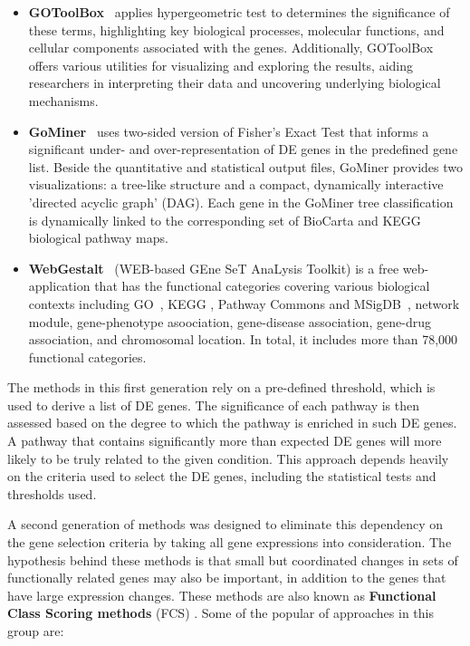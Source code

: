 \documentclass[Minh_PhD_thesis.tex]{subfiles}
\begin{document}
\begin{itemize}
\item \textbf{GOToolBox}~\cite{Martin:2004} applies hypergeometric test to determines the significance of these terms, highlighting key biological processes, molecular functions, and cellular components associated with the genes. Additionally, GOToolBox offers various utilities for visualizing and exploring the results, aiding researchers in interpreting their data and uncovering underlying biological mechanisms.

\item \textbf{GoMiner}~\cite{GoMiner, Zeeberg:2005} uses two-sided version of Fisher's Exact Test that informs a significant under- and over-representation of DE genes in the predefined gene list. Beside the quantitative and statistical output files, GoMiner provides two visualizations: a tree-like structure and a compact, dynamically interactive 'directed acyclic graph' (DAG). Each gene in the GoMiner tree classification is dynamically linked to the corresponding set of BioCarta and KEGG biological pathway maps.

\item \textbf{WebGestalt}~\cite{zhang2005webgestalt, wang2013web} (WEB-based GEne SeT AnaLysis Toolkit) is a free web-application that has the functional categories covering various biological contexts including GO~\cite{Ashburner:2000}, KEGG \cite{kanehisa:2008}, Pathway Commons \cite{cerami2011pathway} and MSigDB~\cite{liberzon2011molecular}, network module, gene-phenotype asoociation, gene-disease association, gene-drug association, and chromosomal location. In total, it includes more than 78,000 functional categories.

\end{itemize}

The methods in this first generation rely on a pre-defined threshold, which is used to derive a list of DE genes. The significance of each pathway is then assessed based on the degree to which the pathway is enriched in such DE genes. A pathway that contains significantly more than expected DE genes will more likely to be truly related to the given condition.  
This approach depends heavily on the criteria used to select the DE genes, including the statistical tests and thresholds used. 


A second generation of methods was designed to eliminate this dependency on the gene selection  criteria by taking all gene expressions into consideration. 
The hypothesis behind these methods is that small but coordinated changes in sets of functionally related genes may also be important, in addition to the genes that have large expression changes.
These methods are also known as \textbf{Functional Class Scoring methods} (FCS) \cite{ackermann2009general}.
Some of the popular of approaches in this group are:
\end{document}
